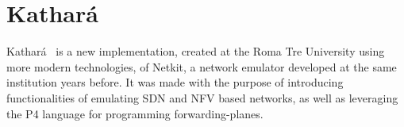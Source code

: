 
\chapter{Kathará}
\label{ch:kathara}

Kathará~\cite{kathara} is a new implementation, created at the Roma Tre University using more modern technologies, of Netkit, a network emulator developed at the same institution years before.
It was made with the purpose of introducing functionalities of emulating SDN and NFV based networks, as well as leveraging the P4 language for programming forwarding-planes.







